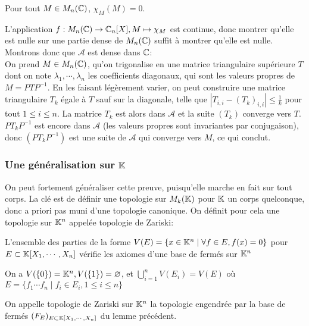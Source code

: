 \documentclass{article}
\begin{document}
\begin{theoreme}
    Pour tout $M \in M_n(\mathbb{C})$, $\chi_M(M) = 0$.
\end{theoreme}

L'application $f: M_n(\mathbb{C}) \to \mathbb{C}_n[X], M \mapsto \chi_M$ est continue, donc montrer qu'elle est nulle sur une partie dense de $M_n(\mathbb{C})$ suffit à montrer qu'elle est nulle. Montrons donc que $\mathcal{A}$ est dense dans $\mathbb{C}$:\\

On prend $M \in M_n(\mathbb{C})$, qu'on trigonalise en une matrice triangulaire supérieure $T$ dont on note $\lambda_1, \cdots, \lambda_n$ les coefficients diagonaux, qui sont les valeurs propres de $M = PTP^{-1}$. En les faisant légèrement varier, on peut construire une matrice triangulaire $T_k$ égale à $T$ sauf sur la diagonale, telle que $|T_{i,i} - (T_k)_{i, i}| \leq \frac{1}{k}$ pour tout $1 \leq i \leq n$. La matrice $T_k$ est alors dans $\mathcal{A}$ et la suite $(T_k)$ converge vers $T$. $PT_kP^{-1}$ est encore dans $\mathcal{A}$ (les valeurs propres sont invariantes par conjugaison), donc $(PT_kP^{-1})$ est une suite de $\mathcal{A}$ qui converge vers $M$, ce qui conclut.\\

\subsubsection{Une généralisation sur $\mathbb{K}$}

On peut fortement généraliser cette preuve, puisqu'elle marche en fait sur tout corps. La clé est de définir une topologie sur $M_k(\mathbb{K})$ pour $\mathbb{K}$ un corps quelconque, donc a priori pas muni d'une topologie canonique. On définit pour cela une topologie sur $\mathbb{K}^n$ appelée topologie de Zariski:

\begin{lemme}
    L'ensemble des parties de la forme $V(E) = \{x \in \mathbb{K}^n \mid \forall f \in E, f(x) = 0 \}$ pour $E \subset \mathbb{K}[X_1, \cdots, X_n]$ vérifie les axiomes d'une base de fermés sur $\mathbb{K}^n$
\end{lemme}

\begin{preuve}
    On a $V(\{0\}) = \mathbb{K}^n, V(\{1\}) = \varnothing$, et $\bigcup_{i=1}^{n}{V(E_i)} = V(E)$ où $E = \{f_1\cdots f_n \mid f_i \in E_i, 1 \leq i \leq n\}$
\end{preuve}

\begin{definition}
    On appelle topologie de Zariski sur $\mathbb{K}^n$ la topologie engendrée par la base de fermés $(F_E)_{E \subset  \mathbb{K}[X_1, \cdots, X_n]}$ du lemme précédent.
\end{definition}
\end{document}
